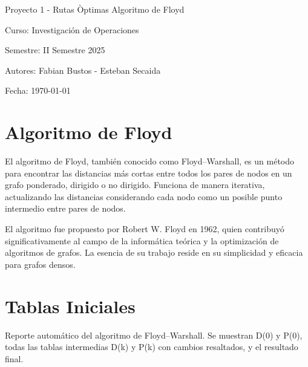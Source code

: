 \documentclass{article}
\begin{document}
\begin{titlepage}
  \centering
  \vfill
  {\Huge Proyecto 1 - Rutas Òptimas Algoritmo de Floyd}\par
  \vspace{1cm}
  {\Large Curso: Investigación de Operaciones}\par
  {\Large Semestre: II Semestre 2025}\par
  \vfill
  {\Large Autores: Fabian Bustos - Esteban Secaida}\par
  \vspace{1cm}
  {\large Fecha: \today}\par
  \vfill
\end{titlepage}

\section*{Algoritmo de Floyd}
El algoritmo de Floyd, también conocido como Floyd--Warshall, es un método para encontrar las distancias más cortas entre todos los pares de nodos en un grafo ponderado, dirigido o no dirigido. Funciona de manera iterativa, actualizando las distancias considerando cada nodo como un posible punto intermedio entre pares de nodos.

El algoritmo fue propuesto por Robert W. Floyd en 1962, quien contribuyó significativamente al campo de la informática teórica y la optimización de algoritmos de grafos. La esencia de su trabajo reside en su simplicidad y eficacia para grafos densos.

\section*{Tablas Iniciales}
Reporte automático del algoritmo de Floyd--Warshall. Se muestran D(0) y P(0), todas las tablas intermedias D(k) y P(k) con cambios resaltados, y el resultado final.
\end{document}
